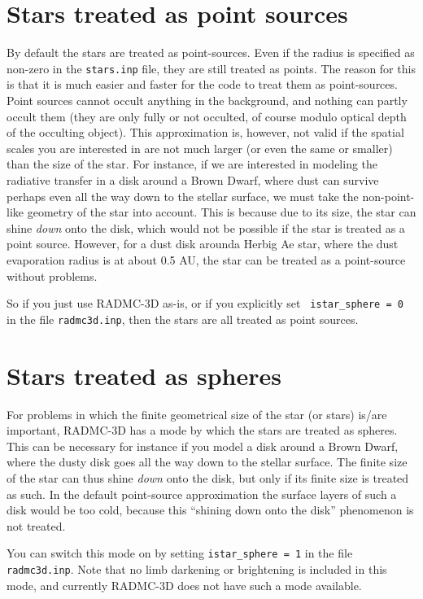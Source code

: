 \documentclass{report}
\begin{document}
\section{Stars treated as point sources}
\label{sec-stars-as-points}
%
By default the stars are treated as point-sources. Even if the radius is
specified as non-zero in the {\small\tt stars.inp} file, they are still
treated as points. The reason for this is that it is much easier and faster
for the code to treat them as point-sources. Point sources cannot occult
anything in the background, and nothing can partly occult them (they are
only fully or not occulted, of course modulo optical depth of the occulting
object). This approximation is, however, not valid if the spatial scales you
are interested in are not much larger (or even the same or smaller) than the
size of the star. For instance, if we are interested in modeling the
radiative transfer in a disk around a Brown Dwarf, where dust can survive
perhaps even all the way down to the stellar surface, we must take the
non-point-like geometry of the star into account. This is because due to its
size, the star can shine {\em down} onto the disk, which would not be
possible if the star is treated as a point source. However, for a dust disk
arounda Herbig Ae star, where the dust evaporation radius is at about 0.5
AU, the star can be treated as a point-source without problems.

So if you just use RADMC-3D as-is, or if you explicitly set {\small\tt
  istar\_sphere = 0} in the file {\small\tt radmc3d.inp}, then the stars are
all treated as point sources.


\section{Stars treated as spheres}
\label{sec-stars-as-spheres}
%
For problems in which the finite geometrical size of the star (or stars)
is/are important, RADMC-3D has a mode by which the stars are treated as
spheres. This can be necessary for instance if you model a disk around
a Brown Dwarf, where the dusty disk goes all the way down to the stellar
surface. The finite size of the star can thus shine {\em down} onto the
disk, but only if its finite size is treated as such. In the default
point-source approximation the surface layers of such a disk would be
too cold, because this ``shining down onto the disk'' phenomenon is
not treated.

You can switch this mode on by setting {\small\tt istar\_sphere = 1} in the
file {\small\tt radmc3d.inp}. Note that no limb darkening or brightening is
included in this mode, and currently RADMC-3D does not have such a mode
available. 
\end{document}
